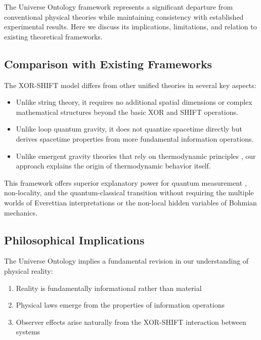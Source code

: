 The Universe Ontology framework represents a significant departure from conventional physical theories while maintaining consistency with established experimental results. Here we discuss its implications, limitations, and relation to existing theoretical frameworks.

\subsection{Comparison with Existing Frameworks}

The XOR-SHIFT model differs from other unified theories in several key aspects:

\begin{itemize}
    \item Unlike string theory, it requires no additional spatial dimensions or complex mathematical structures beyond the basic XOR and SHIFT operations.
    \item Unlike loop quantum gravity, it does not quantize spacetime directly but derives spacetime properties from more fundamental information operations.
    \item Unlike emergent gravity theories that rely on thermodynamic principles \cite{Verlinde2011}, our approach explains the origin of thermodynamic behavior itself.
\end{itemize}

This framework offers superior explanatory power for quantum measurement \cite{Zurek2003}, non-locality, and the quantum-classical transition without requiring the multiple worlds of Everettian interpretations or the non-local hidden variables of Bohmian mechanics.

\subsection{Philosophical Implications}

The Universe Ontology implies a fundamental revision in our understanding of physical reality:

\begin{enumerate}
    \item Reality is fundamentally informational rather than material
    \item Physical laws emerge from the properties of information operations
    \item Observer effects arise naturally from the XOR-SHIFT interaction between systems
\end{enumerate}

